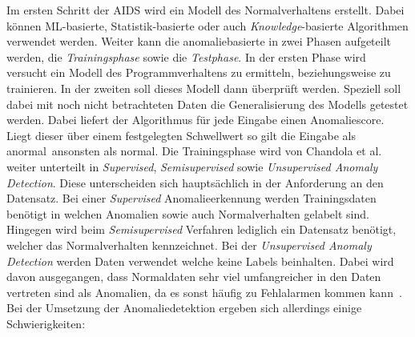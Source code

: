                Im ersten Schritt der AIDS wird ein Modell des Normalverhaltens erstellt.
                Dabei können ML-basierte, Statistik-basierte oder auch 
                \textit{Knowledge}-basierte  Algorithmen verwendet werden.
                Weiter kann die anomaliebasierte  in zwei Phasen aufgeteilt werden,
                die \textit{Trainingsphase} sowie die \textit{Testphase}.
                In der ersten Phase wird versucht ein Modell des Programmverhaltens zu ermitteln,
                beziehungsweise zu trainieren.
                In der zweiten soll dieses Modell dann überprüft werden.
                Speziell soll dabei mit noch nicht betrachteten Daten die Generalisierung des Modells getestet werden. 
                Dabei liefert der Algorithmus für jede Eingabe einen Anomaliescore.
                Liegt dieser über einem festgelegten Schwellwert so gilt die Eingabe als 
                \glqq anormal\grqq \ ansonsten als \glqq normal\grqq.
                Die Trainingsphase wird von Chandola et al.~\cite{ANOMALYSURVEY} weiter unterteilt in \textit{Supervised},
                \textit{Semisupervised} sowie \textit{Unsupervised Anomaly Detection}.
                Diese unterscheiden sich hauptsächlich in der Anforderung an den Datensatz. 
                Bei einer \textit{Supervised} Anomalieerkennung werden Trainingsdaten benötigt 
                in welchen Anomalien sowie auch Normalverhalten gelabelt sind.
                Hingegen wird beim \textit{Semisupervised} Verfahren lediglich ein Datensatz benötigt,
                welcher das Normalverhalten kennzeichnet.
                Bei der \textit{Unsupervised Anomaly Detection} werden Daten verwendet welche keine Labels beinhalten.
                Dabei wird davon ausgegangen, dass Normaldaten sehr viel umfangreicher in den Daten vertreten sind als Anomalien,
                da es sonst häufig zu Fehlalarmen kommen kann~\cite{ANOMALYSURVEY2}.
                Bei der Umsetzung der Anomaliedetektion ergeben sich allerdings einige Schwierigkeiten:
